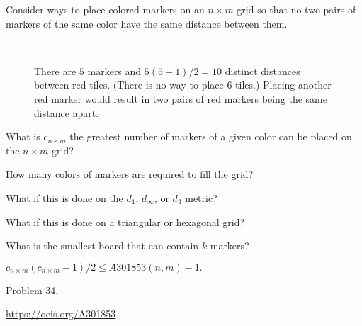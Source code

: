\documentclass{article}
\begin{document}
  Consider ways to place colored markers on an $n \times m$ grid so that no two
  pairs of markers of the same color have the same distance between them.

\begin{figure}[!h]
  \centering
  \\
  \caption{
    There are $5$ markers and $5(5-1)/2 = 10$ distinct distances between red
    tiles. (There is no way to place $6$ tiles.)
    Placing another red marker would result in two pairs of red markers being
    the same distance apart.
  }
\end{figure}

\begin{question}
  What is $c_{n \times m}$ the greatest number of markers of a given color can
  be placed on the $n \times m$ grid?
\end{question}
\begin{related}
  \item How many colors of markers are required to fill the grid?
  \item What if this is done on the $d_1$, $d_\infty$, or $d_3$ metric?
  \item What if this is done on a triangular or hexagonal grid?
  \item What is the smallest board that can contain $k$ markers?
\end{related}
\begin{note}
  $c_{n \times m}(c_{n \times m}-1)/2 \leq A301853(n, m) - 1.$
\end{note}
\begin{references}
  \item Problem 34.
  \item \url{https://oeis.org/A301853}
\end{references}
\end{document}

